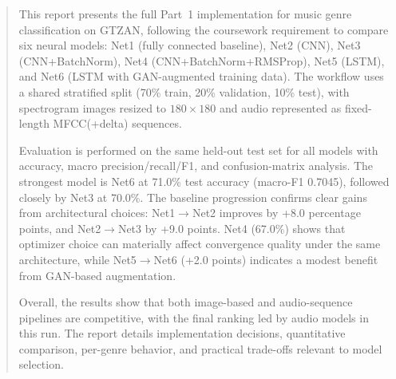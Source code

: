 \begin{abstract}
This report presents the full Part~1 implementation for music genre classification on GTZAN, following the coursework requirement to compare six neural models: Net1 (fully connected baseline), Net2 (CNN), Net3 (CNN+BatchNorm), Net4 (CNN+BatchNorm+RMSProp), Net5 (LSTM), and Net6 (LSTM with GAN-augmented training data). The workflow uses a shared stratified split (70\% train, 20\% validation, 10\% test), with spectrogram images resized to $180\times180$ and audio represented as fixed-length MFCC(+delta) sequences.

Evaluation is performed on the same held-out test set for all models with accuracy, macro precision/recall/F1, and confusion-matrix analysis. The strongest model is Net6 at 71.0\% test accuracy (macro-F1 0.7045), followed closely by Net3 at 70.0\%. The baseline progression confirms clear gains from architectural choices: Net1$\rightarrow$Net2 improves by +8.0 percentage points, and Net2$\rightarrow$Net3 by +9.0 points. Net4 (67.0\%) shows that optimizer choice can materially affect convergence quality under the same architecture, while Net5$\rightarrow$Net6 (+2.0 points) indicates a modest benefit from GAN-based augmentation.

Overall, the results show that both image-based and audio-sequence pipelines are competitive, with the final ranking led by audio models in this run. The report details implementation decisions, quantitative comparison, per-genre behavior, and practical trade-offs relevant to model selection.
\end{abstract}